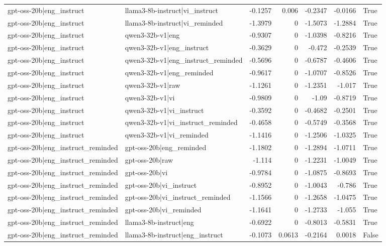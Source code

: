 \begin{table}
\begin{tabular}{l l r r r r l}
gpt-oss-20b|eng_instruct & llama3-8b-instruct|vi_instruct & -0.1257 & 0.006 & -0.2347 & -0.0166 & True \\
gpt-oss-20b|eng_instruct & llama3-8b-instruct|vi_reminded & -1.3979 & 0 & -1.5073 & -1.2884 & True \\
gpt-oss-20b|eng_instruct & qwen3-32b-v1|eng & -0.9307 & 0 & -1.0398 & -0.8216 & True \\
gpt-oss-20b|eng_instruct & qwen3-32b-v1|eng_instruct & -0.3629 & 0 & -0.472 & -0.2539 & True \\
gpt-oss-20b|eng_instruct & qwen3-32b-v1|eng_instruct_reminded & -0.5696 & 0 & -0.6787 & -0.4606 & True \\
gpt-oss-20b|eng_instruct & qwen3-32b-v1|eng_reminded & -0.9617 & 0 & -1.0707 & -0.8526 & True \\
gpt-oss-20b|eng_instruct & qwen3-32b-v1|raw & -1.1261 & 0 & -1.2351 & -1.017 & True \\
gpt-oss-20b|eng_instruct & qwen3-32b-v1|vi & -0.9809 & 0 & -1.09 & -0.8719 & True \\
gpt-oss-20b|eng_instruct & qwen3-32b-v1|vi_instruct & -0.3592 & 0 & -0.4682 & -0.2501 & True \\
gpt-oss-20b|eng_instruct & qwen3-32b-v1|vi_instruct_reminded & -0.4658 & 0 & -0.5749 & -0.3568 & True \\
gpt-oss-20b|eng_instruct & qwen3-32b-v1|vi_reminded & -1.1416 & 0 & -1.2506 & -1.0325 & True \\
gpt-oss-20b|eng_instruct_reminded & gpt-oss-20b|eng_reminded & -1.1802 & 0 & -1.2894 & -1.0711 & True \\
gpt-oss-20b|eng_instruct_reminded & gpt-oss-20b|raw & -1.114 & 0 & -1.2231 & -1.0049 & True \\
gpt-oss-20b|eng_instruct_reminded & gpt-oss-20b|vi & -0.9784 & 0 & -1.0875 & -0.8693 & True \\
gpt-oss-20b|eng_instruct_reminded & gpt-oss-20b|vi_instruct & -0.8952 & 0 & -1.0043 & -0.786 & True \\
gpt-oss-20b|eng_instruct_reminded & gpt-oss-20b|vi_instruct_reminded & -1.1566 & 0 & -1.2658 & -1.0475 & True \\
gpt-oss-20b|eng_instruct_reminded & gpt-oss-20b|vi_reminded & -1.1641 & 0 & -1.2733 & -1.055 & True \\
gpt-oss-20b|eng_instruct_reminded & llama3-8b-instruct|eng & -0.6922 & 0 & -0.8013 & -0.5831 & True \\
gpt-oss-20b|eng_instruct_reminded & llama3-8b-instruct|eng_instruct & -0.1073 & 0.0613 & -0.2164 & 0.0018 & False \\

\end{tabular}
\end{table}

